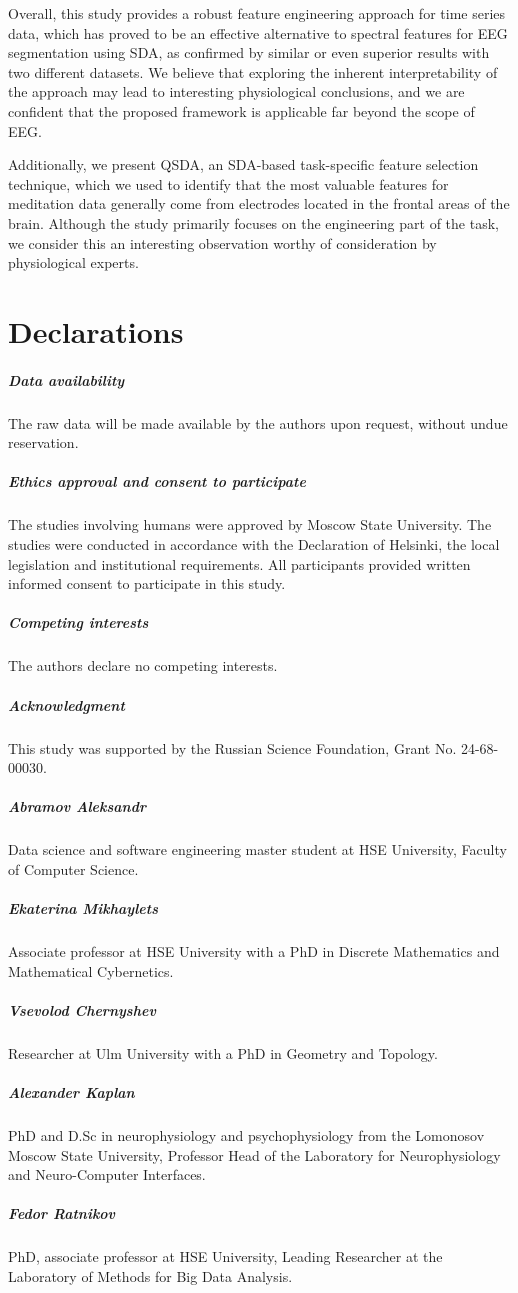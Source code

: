 \documentclass[pdflatex,sn-basic,Numbered]{sn-jnl}
\begin{document}
Overall, this study provides a robust feature engineering approach for time series data, which has proved to be an effective alternative to spectral features for EEG segmentation using SDA, as confirmed by similar or even superior results with two different datasets. We believe that exploring the inherent interpretability of the approach may lead to interesting physiological conclusions, and we are confident that the proposed framework is applicable far beyond the scope of EEG.

Additionally, we present QSDA, an SDA-based task-specific feature selection technique, which we used to identify that the most valuable features for meditation data generally come from electrodes located in the frontal areas of the brain. Although the study primarily focuses on the engineering part of the task, we consider this an interesting observation worthy of consideration by physiological experts.

\section*{Declarations}

\subparagraph{\textbf{Data availability}}
The raw data will be made available by the authors upon request, without undue reservation.

\subparagraph{\textbf{Ethics approval and consent to participate}}
The studies involving humans were approved by Moscow State University. The studies were conducted in accordance with the Declaration of Helsinki, the local legislation and institutional requirements. All participants provided written informed consent to participate in this study.

\subparagraph{\textbf{Competing interests}}
The authors declare no competing interests.

\subparagraph{\textbf{Acknowledgment}}
This study was supported by the Russian Science Foundation, Grant No. 24-68-00030.



\subparagraph{\textbf{Abramov Aleksandr}} Data science and software engineering master student at HSE University, Faculty of Computer Science.
\subparagraph{\textbf{Ekaterina Mikhaylets}} Associate professor at HSE University with a PhD in Discrete Mathematics and Mathematical Cybernetics.
\subparagraph{\textbf{Vsevolod Chernyshev}} Researcher at Ulm University with a PhD in Geometry and Topology.
\subparagraph{\textbf{Alexander Kaplan}} PhD and D.Sc in neurophysiology and psychophysiology from the Lomonosov Moscow State University, Professor Head of the Laboratory for Neurophysiology and Neuro-Computer Interfaces.
\subparagraph{\textbf{Fedor Ratnikov}} PhD, associate professor at HSE University, Leading Researcher at the Laboratory of Methods for Big Data Analysis.
\end{document}
